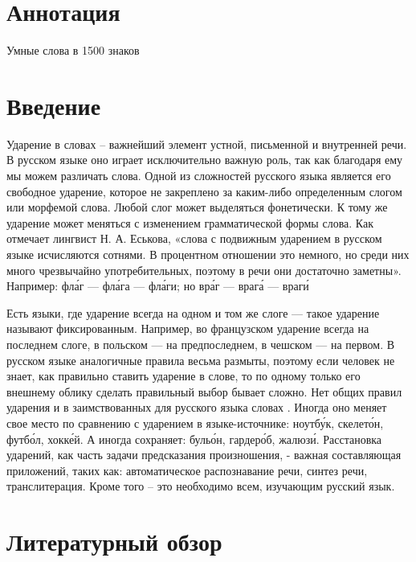 \documentclass[14pt, a4paper, russian]{report}
\begin{document}
\newpage
\begin{normalsize}
\chapter*{Аннотация}


Умные слова в 1500 знаков


\tableofcontents{}


\chapter*{Введение}
Ударение в словах – важнейший элемент устной, письменной и внутренней речи. В русском языке оно играет исключительно важную роль, так как благодаря ему мы можем различать слова. Одной из сложностей русского языка является его свободное ударение, которое не закреплено за каким-либо определенным слогом или морфемой слова. Любой слог может выделяться фонетически. К тому же ударение  может меняться с изменением грамматической формы слова. Как отмечает лингвист Н. А. Еськова, «слова с подвижным ударением в русском языке исчисляются сотнями. В процентном отношении это немного, но среди них много чрезвычайно употребительных, поэтому в речи они достаточно заметны».\cite{eskina} Например: фл\'{а}г — фл\'{а}га — фл\'{а}ги; но вр\'{а}г — враг\'{а} — враг\'{и} 

Есть языки, где ударение  всегда на одном и том же слоге — такое ударение называют фиксированным. Например, во французском ударение всегда на последнем слоге, в польском — на предпоследнем, в чешском — на первом. В русском языке аналогичные правила весьма размыты, поэтому если человек не знает, как правильно ставить ударение в слове, то по одному только его внешнему облику сделать правильный выбор бывает сложно.  Нет общих правил ударения и в заимствованных для русского языка словах . Иногда оно меняет свое место по сравнению с ударением в языке-источнике: ноутб\'{у}к, скелет\'{о}н, футб\'{о}л, хокк\'{е}й. А иногда сохраняет: буль\'{о}н, гардер\'{о}б, жалюз\'{и}.
Расстановка ударений, как часть задачи предсказания произношения, - важная составляющая  приложений, таких как: автоматическое распознавание речи, синтез речи, транслитерация. Кроме того – это необходимо всем, изучающим русский язык.


\newpage

\chapter{Литературный обзор}


\end{normalsize}
\end{document}
